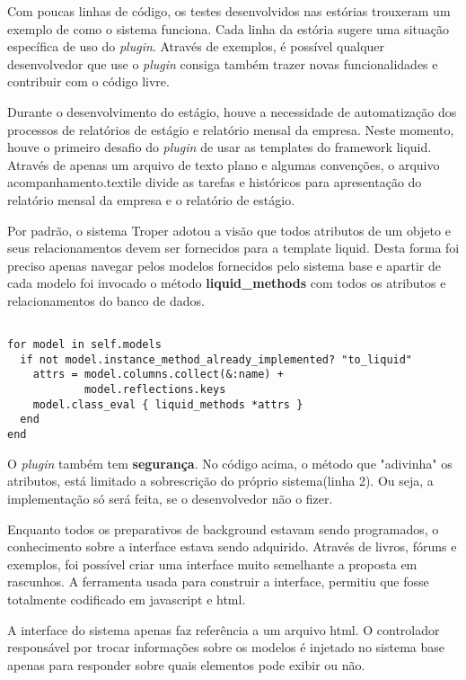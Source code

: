 \documentclass[espaco=simples,appendix=Name]{abnt}
\begin{document}
Com poucas linhas de código, os testes desenvolvidos nas estórias trouxeram um exemplo de como o sistema funciona. Cada linha da estória sugere uma situação específica de uso do \textit{plugin}. Através de exemplos, é possível qualquer desenvolvedor que use o \textit{plugin} consiga também trazer novas funcionalidades e contribuir com o código livre.

Durante o desenvolvimento do estágio, houve a necessidade de automatização dos processos de relatórios de estágio e relatório mensal da empresa. Neste momento, houve o primeiro desafio do \textit{plugin} de usar as templates do framework liquid. Através de apenas um arquivo de texto plano e algumas convenções, o arquivo acompanhamento.textile divide as tarefas e históricos para apresentação do relatório mensal da empresa e o relatório de estágio.

Por padrão, o sistema Troper adotou a visão que todos atributos de um objeto e seus relacionamentos devem ser fornecidos para a template liquid. Desta forma foi preciso apenas navegar pelos modelos fornecidos pelo sistema base e apartir de cada modelo foi invocado o método \textbf{liquid\_methods} com todos os atributos e relacionamentos do banco de dados.

\begin{lstlisting}[caption=Implementação do método to\_liquid através da meta-programação]

for model in self.models
  if not model.instance_method_already_implemented? "to_liquid"
    attrs = model.columns.collect(&:name) +
            model.reflections.keys
    model.class_eval { liquid_methods *attrs } 
  end
end
\end{lstlisting}


O \textit{plugin} também tem \textbf{segurança}. No código acima, o método que "adivinha" os atributos, está limitado a sobrescrição do próprio sistema(linha 2). Ou seja, a implementação só será feita, se o desenvolvedor não o fizer.

Enquanto todos os preparativos de background estavam sendo programados, o conhecimento sobre a interface estava sendo adquirido. Através de livros, fóruns e exemplos, foi possível criar uma interface muito semelhante a proposta em rascunhos. A ferramenta usada para construir a interface, permitiu que fosse totalmente codificado em javascript e html.

A interface do sistema apenas faz referência a um arquivo html. O controlador responsável por trocar informações sobre os modelos é injetado no sistema base apenas para responder sobre quais elementos pode exibir ou não.
\end{document}
